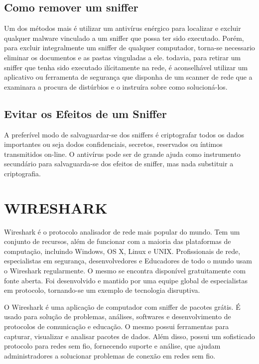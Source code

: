 \documentclass[12pt]{article}
\begin{document}
\subsection{Como remover um sniffer}
Um dos métodos mais é utilizar um antivírus enérgico para localizar e excluir qualquer malware vinculado a um sniffer que possa ter sido executado. Porém, para excluir integralmente um sniffer de qualquer computador, torna-se necessario eliminar os documentos e as pastas vinguladas a ele. todavia, para retirar um sniffer que tenha sido executado ilícitamente na rede, é aconselhável utilizar um aplicativo ou ferramenta de segurança que disponha de um scanner de rede que a examinara a procura de distúrbios e o instruíra sobre como solucioná-los. 

\subsection{Evitar os Efeitos de um Sniffer}
A preferível modo de salvaguardar-se dos sniffers é criptografar todos os dados importantes ou seja dodos confidenciais, secretos, reservados ou íntimos transmitidos on-line. O antivírus pode ser de grande ajuda como instrumento secundário para salvaguarda-se dos efeitos de  sniffer, mas nada substituir a criptografia.

\section{WIRESHARK} \label{sec:firstpage}

Wireshark é o protocolo analisador de rede mais popular do mundo. Tem um conjunto de recursos, além de funcionar com a maioria das 
plataformas de computação, incluindo Windows, OS X, Linux e
UNIX. 
Profissionais de rede, especialistas em segurança, desenvolvedores e
Educadores de todo o mundo usam o Wireshark regularmente. O mesmo se encontra disponível gratuitamente
com fonte aberta. Foi desenvolvido e mantido por uma
equipe global de especialistas em protocolo, tornando-se um exemplo de
tecnologia disruptiva. 

O Wireshark é uma aplicação de computador com sniffer de pacotes grátis.
É usado para solução de problemas, análises, softwares e
desenvolvimento de protocolos de comunicação e educação. O mesmo possui ferramentas para capturar, visualizar e analisar pacotes de dados. Além disso, possui um sofisticado protocolo para redes sem fio,
fornecendo suporte e análise, que ajudam administradores a solucionar problemas de conexão em redes sem fio. 
\end{document}
